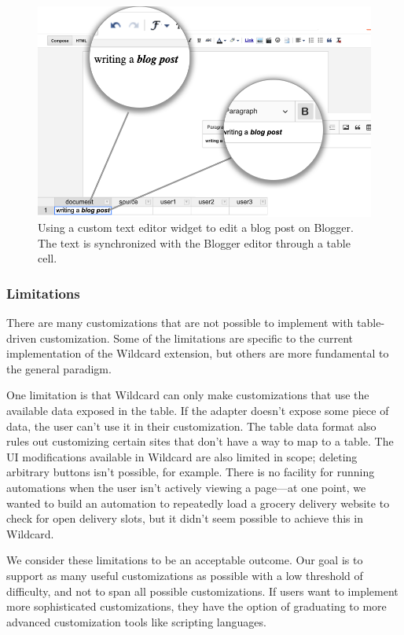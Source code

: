 \documentclass[sigplan,screen,10pt,anonymous,review]{acmart}
\begin{document}
\begin{figure}
\hypertarget{fig:blogger}{%
\centering
\includegraphics[width=\columnwidth]{media/blogger.png}
\caption{Using a custom text editor widget to edit a blog post on Blogger. The text is synchronized with the Blogger editor through a table cell.}\label{fig:blogger}
}
\end{figure}

\hypertarget{limitations}{%
\subsubsection{Limitations}\label{limitations}}

There are many customizations that are not possible to implement with
table-driven customization. Some of the limitations are specific to the
current implementation of the Wildcard extension, but others are more
fundamental to the general paradigm.

One limitation is that Wildcard can only make customizations that use
the available data exposed in the table. If the adapter doesn't expose
some piece of data, the user can't use it in their customization. The
table data format also rules out customizing certain sites that don't
have a way to map to a table. The UI modifications available in Wildcard
are also limited in scope; deleting arbitrary buttons isn't possible,
for example. There is no facility for running automations when the user
isn't actively viewing a page---at one point, we wanted to build an
automation to repeatedly load a grocery delivery website to check for
open delivery slots, but it didn't seem possible to achieve this in
Wildcard.

We consider these limitations to be an acceptable outcome. Our goal is
to support as many useful customizations as possible with a low
threshold of difficulty, and not to span all possible customizations. If
users want to implement more sophisticated customizations, they have the
option of graduating to more advanced customization tools like scripting
languages.
\end{document}
